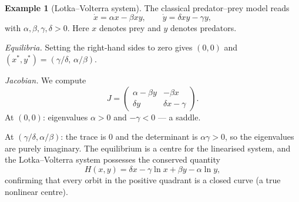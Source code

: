 \documentclass[12pt,a4paper,openany]{book}
\theoremstyle{definition}
\newtheorem{example}[definition]{Example}
\theoremstyle{plain}
\theoremstyle{remark}
\begin{document}
\begin{example}[Lotka--Volterra system]
\label{ex:lotka-volterra-full}
The classical predator--prey model reads
\begin{equation}\label{eq:lotka-volterra}
  \dot{x} = \alpha x - \beta xy, \qquad
  \dot{y} = \delta xy - \gamma y,
\end{equation}
with $\alpha,\beta,\gamma,\delta>0$. Here $x$ denotes prey and $y$
denotes predators.

\emph{Equilibria.} Setting the right-hand sides to zero gives
$(0,0)$ and $(x^{*},y^{*})=(\gamma/\delta,\,\alpha/\beta)$.

\emph{Jacobian.} We compute
\[
  J = \begin{pmatrix}
    \alpha-\beta y & -\beta x \\
    \delta y & \delta x - \gamma
  \end{pmatrix}.
\]
At $(0,0)$: eigenvalues $\alpha>0$ and $-\gamma<0$ --- a saddle.

At $(\gamma/\delta,\alpha/\beta)$: the trace is $0$ and the
determinant is $\alpha\gamma>0$, so the eigenvalues are purely
imaginary. The equilibrium is a centre for the linearised system, and
the Lotka--Volterra system possesses the conserved quantity
\[
  H(x,y) = \delta x - \gamma\ln x + \beta y - \alpha\ln y,
\]
confirming that every orbit in the positive quadrant is a closed curve
(a true nonlinear centre).
\end{example}

\begin{center}
\end{center}
\end{document}
